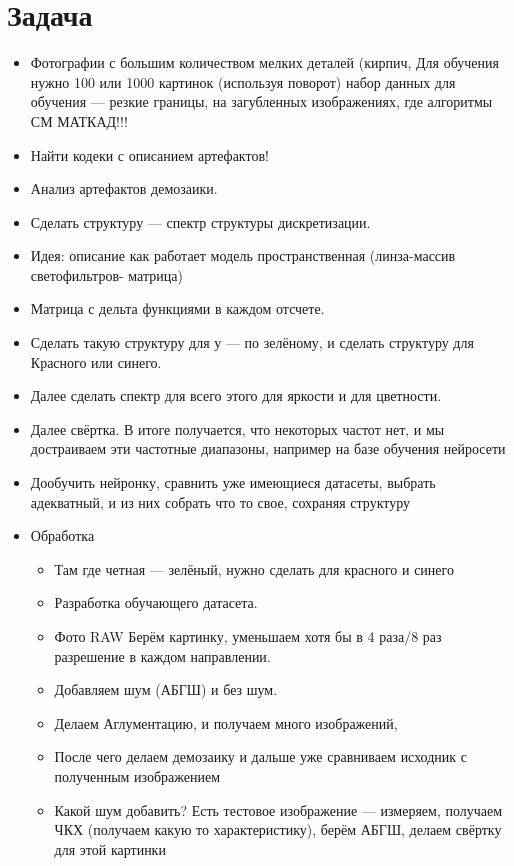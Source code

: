 \documentclass[12pt,a4paper]{article}
\begin{document}
\section{Задача}

\begin{itemize}
    \item Фотографии с большим количеством мелких деталей (кирпич,  Для обучения нужно 100 или 1000 картинок (используя поворот)  набор данных для обучения — резкие границы, на загубленных изображениях, где алгоритмы СМ МАТКАД!!! 
    \item Найти кодеки с описанием артефактов! 
    \item Анализ артефактов демозаики. 
    \item Сделать структуру — спектр структуры дискретизации. 
    \item Идея: описание как работает модель  пространственная (линза-массив светофильтров- матрица) 
    \item Матрица с дельта функциями в каждом отсчете. 
    \item Сделать такую структуру для у — по зелёному, и сделать структуру для Красного или синего. 
    \item Далее сделать спектр для всего этого для яркости и для цветности. 
    \item Далее свёртка.  В итоге получается, что некоторых частот нет, и мы достраиваем эти частотные диапазоны, например на базе обучения нейросети   
    \item Дообучить нейронку, сравнить уже имеющиеся датасеты, выбрать адекватный, и из них собрать что то свое, сохраняя структуру   
    \item Обработка
    \begin{itemize}
        \item Там где четная — зелёный, нужно сделать для красного и синего  
        \item Разработка обучающего датасета. 
        \item Фото RAW Берём картинку, уменьшаем хотя бы в 4 раза/8 раз разрешение в каждом направлении. 
        \item Добавляем шум (АБГШ) и без шум. 
        \item Делаем Аглументацию, и получаем много изображений, 
        \item После чего делаем демозаику и дальше уже сравниваем исходник с полученным изображением
        \item Какой шум добавить? Есть тестовое изображение — измеряем, получаем ЧКХ (получаем какую то характеристику), берём АБГШ, делаем свёртку для этой картинки
    \end{itemize}
\end{itemize}
\end{document}
